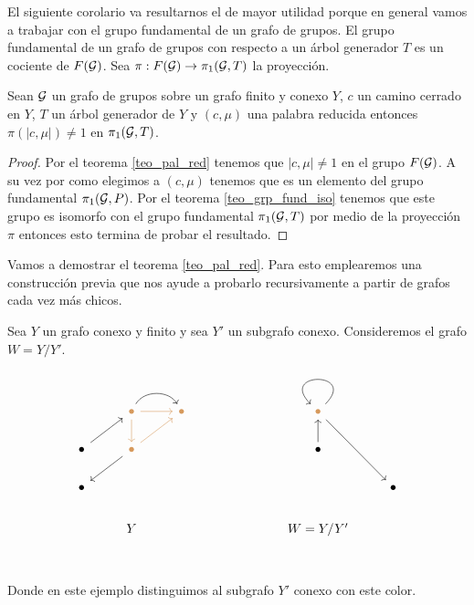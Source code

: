 \documentclass[tesis.tex]{subfiles}
\begin{document}
El siguiente corolario va resultarnos el de mayor utilidad porque en general vamos a trabajar con el grupo fundamental de un grafo de grupos.
El grupo fundamental de un grafo de grupos con respecto a un árbol generador $T$ es un cociente de $F({\cal G})$. 
Sea $\pi: F({\cal G}) \to \pi_1({\cal G},T)$ la proyección.

\begin{coro}\label{coro_pal_red_3}
	Sean ${\cal G}$ un grafo de grupos sobre un grafo finito y conexo $Y$, $c$ un camino cerrado en $Y$, $T$ un árbol generador de $Y$ y $(c, \mu)$ una palabra reducida entonces $\pi(|c,\mu|) \neq 1$ en $\pi_1({\cal G}, T)$. 
\end{coro}
\begin{proof}
	Por el teorema \ref{teo_pal_red} tenemos que $|c,\mu| \neq 1$ en el grupo $F({\cal G})$.
	A su vez por como elegimos a $(c, \mu)$ tenemos que es un elemento del grupo fundamental $\pi_1({\cal G}, P)$.
	Por el teorema \ref{teo_grp_fund_iso} tenemos que este grupo es isomorfo con el grupo fundamental $\pi_1({\cal G}, T)$ por medio de la proyección $\pi$ entonces esto termina de probar el resultado.
\end{proof}

Vamos a demostrar el teorema \ref{teo_pal_red}.
Para esto emplearemos una construcción previa que nos ayude a probarlo recursivamente a partir de grafos cada vez más chicos.


Sea $Y$ un grafo conexo y finito y sea $Y'$ un subgrafo conexo.
Consideremos el grafo $W = Y/Y'$.

\[\begin{tikzcd}
	& \color{rgb,255:red,214;green,153;blue,92}\bullet &  \color{rgb,255:red,214;green,153;blue,92} \bullet &&&  \color{rgb,255:red,214;green,153;blue,92} \bullet \\
	\bullet & \color{rgb,255:red,214;green,153;blue,92} \bullet &&&& \bullet \\
	\bullet &&&&&& \bullet \\
	& Y &&&& W = Y/Y' \\ 	
	\arrow[color={rgb,255:red,214;green,153;blue,92}, from=1-2, to=1-3]
	\arrow[color={rgb,255:red,214;green,153;blue,92}, from=1-2, to=2-2]
	\arrow[color={rgb,255:red,214;green,153;blue,92}, from=2-2, to=1-3]
	\arrow[from=2-1, to=1-2]
	\arrow[bend left=60, from=1-2, to=1-3]
	\arrow[from=2-2, to=3-1]
	\arrow[from=1-6, to=3-7]
	\arrow[from=2-6, to=1-6]
	\arrow[loop, from=1-6, to=1-6]
\end{tikzcd}\]
Donde en este ejemplo distinguimos al subgrafo $Y'$ conexo con este \textcolor{rgb,255:red,214;green,153;blue,92}{color}.
\end{document}
